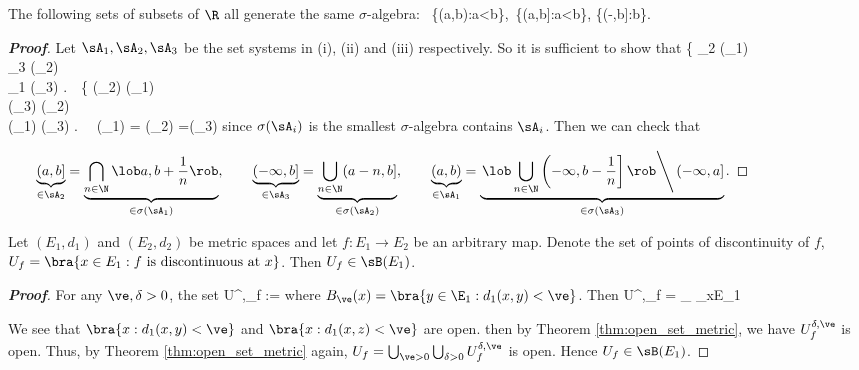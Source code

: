 \begin{lemma}\label{lem:open_sets_half_open_sets_close_infinity_sets_generate_the_same_sigma_algebra}
The following sets of subsets of $\R$ all generate the same $\sigma$-algebra:
\be
{}\ \{(a,b):a<b\},\quad \quad{}\ \{(a,b]:a<b\},\quad\quad {} \{(-\infty,b]:b\in \R\}.
\ee
\end{lemma}
\begin{proof}[\bf Proof]
Let $\sA_1,\sA_2,\sA_3$ be the set systems in (i), (ii) and (iii) respectively. So it is sufficient to show that
\be
\left\{
\sA_2 \subseteq \sigma(\sA_1)\\
\sA_3 \subseteq \sigma(\sA_2)\\
\sA_1 \subseteq \sigma(\sA_3)
\ea\right.\ \ra \
\left\{
\sigma(\sA_2) \subseteq \sigma(\sA_1)\\
\sigma(\sA_3) \subseteq \sigma(\sA_2)\\
\sigma(\sA_1) \subseteq \sigma(\sA_3)
\ea\right. \ \ra \ \sigma(\sA_1) = \sigma(\sA_2) =\sigma(\sA_3)
\ee
since $\sigma(\sA_i)$ is the smallest $\sigma$-algebra contains $\sA_i$. Then we can check that
\vspace{2mm}

$\qquad\underbrace{(a,b]}_{\in\sA_2} = \underbrace{\bigcap_{n\in \N}\lob a,b+\frac 1n\rob}_{\in \sigma(\sA_1)},\quad\quad \underbrace{(-\infty,b]}_{\in\sA_3} = \underbrace{\bigcup_{n\in \N}( a-n,b]}_{\in \sigma(\sA_2)},\quad\quad \underbrace{(a,b)}_{\in\sA_1} = \underbrace{\left.\lob\bigcup_{n\in \N}\left(-\infty,b-\frac 1n\right]\rob \right\backslash (-\infty, a]}_{\in \sigma(\sA_3)}$.
\end{proof}

\begin{proposition}
Let $(E_1,d_1)$ and $(E_2,d_2)$ be metric spaces and let $f:E_1\to E_2$ be an arbitrary map. Denote the set of points of discontinuity of $f$, $U_f = \bra{x\in E_1:f \text{ is discontinuous at }x}$. Then $U_f \in \sB(E_1)$.
\end{proposition}

\begin{proof}[\bf Proof]
For any $\ve,\delta >0$, the set%
\be
U^{\delta,\ve}_f := 
\ee
where $B_\ve(x) = \bra{y\in \E_1:d_1(x,y)<\ve}$. Then
\be
U^{\delta,\ve}_f = \bigcup_{} \bigcup_{x\in E_1} \cap {}
\ee

We see that $\bra{x:d_1(x,y)<\ve}$ and $\bra{x:d_1(x,z)<\ve}$ are open. then by Theorem \ref{thm:open_set_metric}, we have $U^{\delta,\ve}_f$ is open. Thus, by Theorem \ref{thm:open_set_metric} again, $U_f = \bigcup_{\ve >0} \bigcup_{\delta>0}U^{\delta,\ve}_f$ is open. Hence $U_f\in \sB(E_1)$.
\end{proof}

